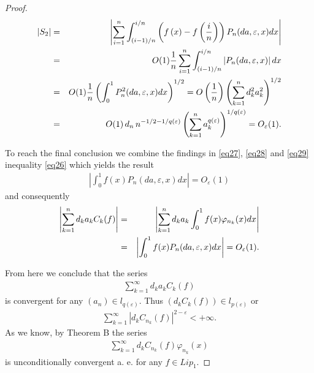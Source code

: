 \documentclass{publmathdeb}
\begin{document}
\begin{proof}
		\begin{eqnarray}
			\label{eq29} \left|S_2\right| &=& \left|\sum_{i=1}^{n}\int_{\left(i-1\right)/n}^{i/n}\left(f\left(x\right) -f\left(\frac{i}{n}\right)\right)P_n(da, \varepsilon, x) dx \right| \notag\\
			&=& O(1) \frac{1}{n} \sum_{i=1}^{n} \int_{\left(i-1\right)/n}^{i/n}\left|P_n(da, \varepsilon, x) \right| dx \\
			&=& O(1) \frac{1}{n}  \left(\int_{0}^{1}P_n^2(da, \varepsilon, x) dx \right)^{1/2} \notag = O\left(\frac{1}{n}\right) \left(\sum_{k=1}^{n} d_k^2 a_k^2 \right)^{1/2} \notag \\
			&=& O(1)\, d_n\, n^{-1/2 - 1/q(\varepsilon)} \left( \sum_{k=1}^n a_k^{q(\varepsilon)} \right)^{1/q(\varepsilon)}
			= O_{\varepsilon}(1).  \notag 
		\end{eqnarray}
		
		To reach the final conclusion we combine the findings in \eqref{eq27}, \eqref{eq28} and \eqref{eq29} inequality \eqref{eq26} which yields the result
		\begin{eqnarray*}
			\left|\int_{0}^{1} f(x)P_n(da, \varepsilon, x) dx \right|= O_{\varepsilon}(1)
		\end{eqnarray*}
		and consequently
		\begin{eqnarray}
			\label{eq30} \left|\sum_{k=1}^{n} d_k a_k C_k(f) \right| &=& \left|\sum_{k=1}^{n} d_k a_k \int_{0}^{1} f(x) \varphi_{n_{k}}(x) dx \right| \\ 
			&=& 	\left|\int_{0}^{1} f(x)P_n(da, \varepsilon, x) dx \right|= O_{\varepsilon}(1). \notag
		\end{eqnarray}
		
		From here we conclude that the series 
		\begin{eqnarray*}
			\sum_{k=1}^{\infty} d_k a_k C_k(f)
		\end{eqnarray*}
		is convergent for any $(a_n)\in l_{q(\varepsilon)}.$ Thus   $(d_k C_k (f))\in l_{p(\varepsilon)}$  or
		\begin{eqnarray*}
			\sum_{k=1}^{\infty} \left|d_k C_{n_k}(f)\right|^{2- \varepsilon} < + \infty.
		\end{eqnarray*}
		As we know, by Theorem B the series 
		\begin{eqnarray*}
			\sum_{k=1}^{\infty} d_k C_{n_k}(f)\varphi_{n_{k}}(x)
		\end{eqnarray*}
		is unconditionally convergent a. e. for any $f\in Lip_1.$
		
	\end{proof}
	
\end{document}

